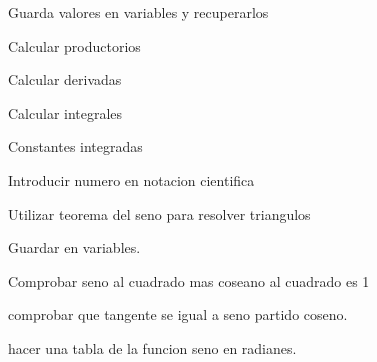 \documentclass[12pt]{article}
\begin{document}
Guarda valores en variables y recuperarlos

Calcular productorios

Calcular derivadas

Calcular integrales

Constantes integradas


\newpage

Introducir numero en notacion cientifica

Utilizar teorema del seno para resolver triangulos



Guardar en variables.




Comprobar seno al cuadrado mas coseano al cuadrado es 1

comprobar que tangente se igual a seno partido coseno.

hacer una tabla de la funcion seno en radianes.
\end{document}

